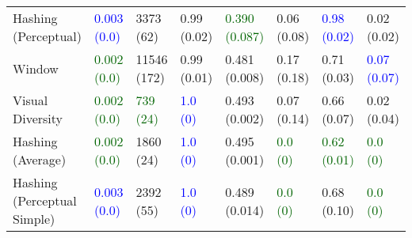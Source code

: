\begin{tabular}{llllllll}
Hashing (Perceptual)        &       \textcolor{blue}{0.003 (0.0)} &                        3373 (62) &                         0.99 (0.02) &  \textcolor{darkgreen}{0.390 (0.087)} &                     0.06 (0.08) &       \textcolor{blue}{0.98 (0.02)} &                       0.02 (0.02) \\
Window                      &  \textcolor{darkgreen}{0.002 (0.0)} &                      11546 (172) &                         0.99 (0.01) &                         0.481 (0.008) &                     0.17 (0.18) &                         0.71 (0.03) &     \textcolor{blue}{0.07 (0.07)} \\
Visual Diversity            &  \textcolor{darkgreen}{0.002 (0.0)} &  \textcolor{darkgreen}{739 (24)} &           \textcolor{blue}{1.0 (0)} &                         0.493 (0.002) &                     0.07 (0.14) &                         0.66 (0.07) &                       0.02 (0.04) \\
Hashing (Average)           &  \textcolor{darkgreen}{0.002 (0.0)} &                        1860 (24) &           \textcolor{blue}{1.0 (0)} &                         0.495 (0.001) &  \textcolor{darkgreen}{0.0 (0)} &  \textcolor{darkgreen}{0.62 (0.01)} &    \textcolor{darkgreen}{0.0 (0)} \\
Hashing (Perceptual Simple) &       \textcolor{blue}{0.003 (0.0)} &                        2392 (55) &           \textcolor{blue}{1.0 (0)} &                         0.489 (0.014) &  \textcolor{darkgreen}{0.0 (0)} &                         0.68 (0.10) &    \textcolor{darkgreen}{0.0 (0)} \\
\bottomrule
\end{tabular}

